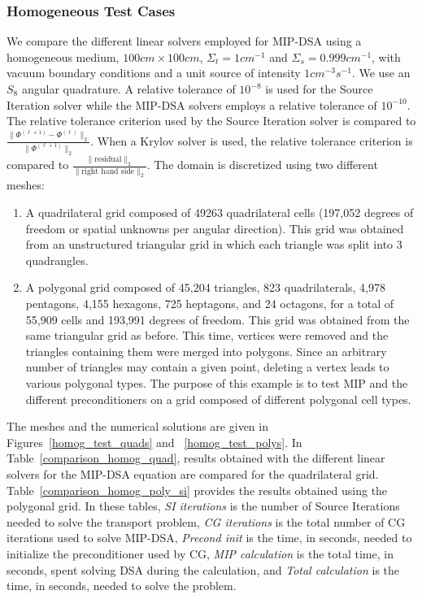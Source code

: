 \documentclass[preprint,10pt]{elsarticle}
\renewcommand{\(}{\left(}
\renewcommand{\)}{\right)}
\renewcommand{\[}{\left[}
\renewcommand{\]}{\right]}
\begin{document}
\subsubsection{Homogeneous Test Cases}  \label{sec_homog}

We compare the different linear solvers employed for MIP-DSA using a homogeneous medium, $100cm
\times 100cm$, $\Sigma_t = 1cm^{-1}$ and $\Sigma_s = 0.999cm^{-1}$, with
vacuum boundary conditions and a unit source of intensity $1cm^{-3}s^{-1}$. We
use an $S_8$ angular quadrature. A relative tolerance of $10^{-8}$ is used for the Source Iteration solver
while the MIP-DSA solvers employs a relative tolerance of $10^{-10}$. The
relative tolerance criterion used by the Source Iteration solver is compared to
$\frac{\|\Phi^{(\ell+1)}-\Phi^{(\ell)}\|_2}{\|\Phi^{(\ell+1)}\|_2}$. When a Krylov solver
is used, the relative tolerance criterion is compared to
$\frac{\|\textrm{residual}\|_2}{\|\textrm{right hand side}\|_2}$.
The domain is discretized using two different meshes:
\begin{enumerate}
  \item A quadrilateral grid composed of 49263 quadrilateral
    cells (197,052 degrees of freedom or spatial unknowns per angular direction). This grid was 
		obtained from an unstructured triangular grid in which each triangle was split into 3 quadrangles.
  \item A polygonal grid composed of 45,204 triangles, 823
    quadrilaterals, 4,978 pentagons, 4,155 hexagons, 725 heptagons, and 24
    octagons, for a total of 55,909 cells and 193,991 degrees of freedom. This grid was obtained 
		from the same triangular grid as before. This time, vertices were removed and the triangles 
		containing them were merged into polygons. Since an arbitrary number of triangles may contain 
		a given point, deleting a vertex leads to various polygonal types. The purpose 
    of this example is to test MIP and the different preconditioners on a
    grid composed of different polygonal cell types.
\end{enumerate}
%
The meshes and the numerical solutions are given in Figures~\ref {homog_test_quads} and~ \ref {homog_test_polys}.
In Table~\ref {comparison_homog_quad}, results obtained with the different linear solvers for the MIP-DSA equation
are compared for the quadrilateral grid. Table~\ref{comparison_homog_poly_si} provides the results obtained using the polygonal grid.
In these tables, 
{\it SI iterations} is the number of Source Iterations needed to solve the transport problem, 
{\it CG iterations} is the total number of CG iterations used to solve MIP-DSA,
{\it Precond init} is the time, in seconds, needed to initialize the preconditioner used by CG, 
{\it MIP calculation} is the total time, in seconds, spent solving DSA during the calculation, and 
{\it Total calculation} is the time, in seconds, needed to solve the problem. 
\end{document}
